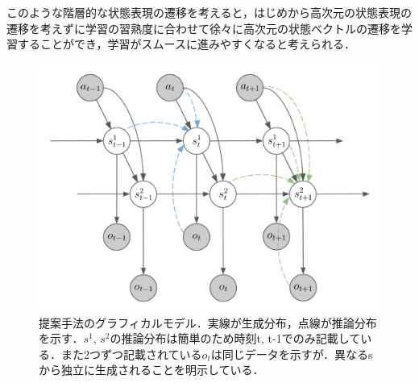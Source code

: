 \documentclass[10pt, twocolumn]{jarticle}
\begin{document}
このような階層的な状態表現の遷移を考えると，はじめから高次元の状態表現の遷移を考えずに学習の習熟度に合わせて徐々に高次元の状態ベクトルの遷移を学習することができ，学習がスムースに進みやすくなると考えられる．



\begin{figure}[tbp]
  \begin{center}
    \includegraphics[width=\linewidth]{./figures/proposal_train.png}
    \caption[提案手法(二階層)のグラフィカルモデル]{提案手法のグラフィカルモデル．実線が生成分布，点線が推論分布を示す．$s^1$, $s^2$の推論分布は簡単のため時刻t, t-1でのみ記載している．また2つずつ記載されている$o_t$は同じデータを示すが．異なるsから独立に生成されることを明示している．}
    \label{fig:proposal}
  \end{center}
\end{figure}
\end{document}
